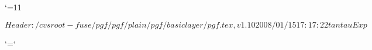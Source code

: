 %
%
%


\edef\pgfatcode{\the\catcode`\@}
\catcode`\@=11



\ProvidesPackageRCS $Header: /cvsroot-fuse/pgf/pgf/plain/pgf/basiclayer/pgf.tex,v 1.10 2008/01/15 17:17:22 tantau Exp $




%
%
%

\catcode`\@=\pgfatcode

\endinput
